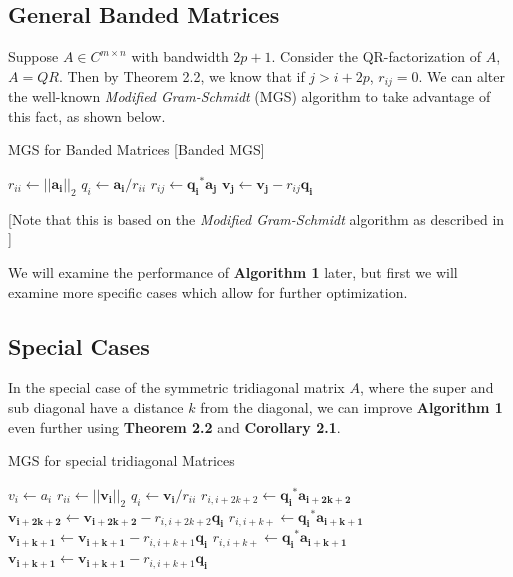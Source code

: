 \documentclass{article}
\numberwithin{pic}{section}
\numberwithin{lem}{section}
\numberwithin{thm}{section}
\numberwithin{cor}{section}
\theoremstyle{definition}
\numberwithin{ex}{section}
\numberwithin{defn}{section}
\theoremstyle{definition}
\theoremstyle{remark}
\newcommand{\set}[1]{\ensuremath{\left\{ #1\right\}}} %
\newcommand{\norm}[1]{\ensuremath{\left | \left | #1 \right | \right |}}
\newlength\tindent
\renewcommand{\indent}{\hspace*{\tindent}}
\begin{document}
\subsection{General Banded Matrices}
\indent Suppose $A\in C^{m\times n}$ with bandwidth $2p +1$. Consider the QR-factorization
of $A$, $A = QR$. Then by Theorem 2.2, we
know that if $j > i + 2p$, $r_{ij} = 0$. We can alter the well-known
\textit{Modified Gram-Schmidt} (MGS) algorithm to take advantage of this fact,
as shown below.
\begin{algorithm}[H]
  \caption{MGS for Banded Matrices [Banded MGS]}
  \begin{algorithmic}[1]
    \State$r_{ii}\gets \norm{\mathbf{a_i}}_2$
    \State$q_i\gets \mathbf{a_i} / r_{ii}$
    \For{$j = i + 1$\textbf{ to }$\text{min}\set{i + 2p, n}$}
    \State$r_{ij}\gets \mathbf{q_i}^*\mathbf{a_j}$
    \State$\mathbf{v_j}\gets\mathbf{v_j} - r_{ij}\mathbf{q_i}$
    \EndFor
    \EndFor
  \end{algorithmic}
  [Note that this is based on the \textit{Modified
    Gram-Schmidt} algorithm as described in \cite{nla}] 
\end{algorithm}
\indent We will examine the performance of \textbf{Algorithm 1} later, but first we will
examine more specific cases which allow for further optimization.
\subsection{Special Cases}
\indent In the special case of the symmetric tridiagonal matrix $A$, where the
super and sub diagonal have a distance $k$ from the diagonal, we can improve
\textbf{Algorithm 1} even further using \textbf{Theorem 2.2} and
\textbf{Corollary 2.1}.
\begin{algorithm}[H]
  \caption{MGS for special tridiagonal Matrices }
  \begin{algorithmic}[1]
   	\State$v_i\gets a_i$
    \EndFor
    \State$r_{ii}\gets \norm{\mathbf{v_i}}_2$
    \State$q_i\gets \mathbf{v_i} / r_{ii}$ 
    	\State$r_{i,i+2k+2}\gets \mathbf{q_i}^*\mathbf{a_{i+2k+2}}$
    	\State$\mathbf{v_{i+2k+2}}\gets\mathbf{v_{i+2k+2}} - r_{i,i+2k+2}\mathbf{q_i}$
    	\State$r_{i,i+k+}\gets \mathbf{q_i}^*\mathbf{a_{i+k+1}}$
    	\State$\mathbf{v_{i+k+1}}\gets\mathbf{v_{i+k+1}} - r_{i,i+k+1}\mathbf{q_i}$
    	\State$r_{i,i+k+}\gets \mathbf{q_i}^*\mathbf{a_{i+k+1}}$
    	\State$\mathbf{v_{i+k+1}}\gets\mathbf{v_{i+k+1}} - r_{i,i+k+1}\mathbf{q_i}$
       	\EndIf
    \EndFor
  \end{algorithmic}
\end{algorithm}
\end{document}

